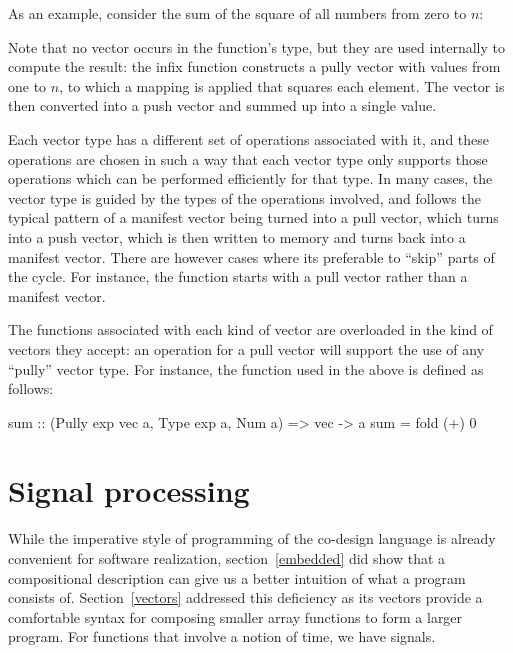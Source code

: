 \documentclass[../paper.tex]{subfiles}
\begin{document}
As an example, consider the sum of the square of all numbers from zero to $n$:


\noindent Note that no vector occurs in the function's type, but they are used internally to compute the result: the infix function  constructs a pully vector with values from one to $n$, to which a mapping is applied that squares each element. The vector is then converted into a push vector and summed up into a single value.

Each vector type has a different set of operations associated with it, and these operations are chosen in such a way that each vector type only supports those operations which can be performed efficiently for that type. In many cases, the vector type is guided by the types of the operations involved, and follows the typical pattern of a manifest vector being turned into a pull vector, which turns into a push vector, which is then written to memory and turns back into a manifest vector. There are however cases where its preferable to ``skip'' parts of the cycle. For instance, the  function starts with a pull vector rather than a manifest vector.

The functions associated with each kind of vector are overloaded in the kind of vectors they accept: an operation for a pull vector will support the use of any ``pully'' vector type. For instance, the  function used in the above  is defined as follows:

\begin{code}
sum :: (Pully exp vec a, Type exp a, Num a) => vec -> a
sum = fold (+) 0
\end{code}

\section{Signal processing}
\label{signals}

While the imperative style of programming of the co-design language is already convenient for software realization, section~\ref{embedded} did show that a compositional description can give us a better intuition of what a program consists of. Section~\ref{vectors} addressed this deficiency as its vectors provide a comfortable syntax for composing smaller array functions to form a larger program. For functions that involve a notion of time, we have signals.
\end{document}
